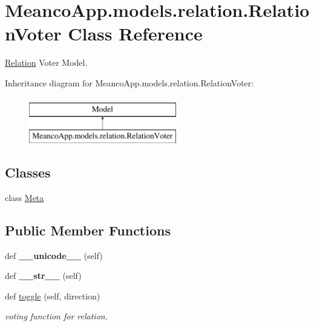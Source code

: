 \hypertarget{class_meanco_app_1_1models_1_1relation_1_1_relation_voter}{}\section{Meanco\+App.\+models.\+relation.\+Relation\+Voter Class Reference}
\label{class_meanco_app_1_1models_1_1relation_1_1_relation_voter}


\hyperlink{class_meanco_app_1_1models_1_1relation_1_1_relation}{Relation} Voter Model.  


Inheritance diagram for Meanco\+App.\+models.\+relation.\+Relation\+Voter\+:\begin{figure}[H]
\begin{center}
\leavevmode
\includegraphics[height=2.000000cm]{class_meanco_app_1_1models_1_1relation_1_1_relation_voter}
\end{center}
\end{figure}
\subsection*{Classes}
\begin{DoxyCompactItemize}
\item 
class \hyperlink{class_meanco_app_1_1models_1_1relation_1_1_relation_voter_1_1_meta}{Meta}
\end{DoxyCompactItemize}
\subsection*{Public Member Functions}
\begin{DoxyCompactItemize}
\item 
\hypertarget{class_meanco_app_1_1models_1_1relation_1_1_relation_voter_a1a8b33965930d1a907be5d90b3a89452}{}\label{class_meanco_app_1_1models_1_1relation_1_1_relation_voter_a1a8b33965930d1a907be5d90b3a89452} 
def {\bfseries \+\_\+\+\_\+unicode\+\_\+\+\_\+} (self)
\item 
\hypertarget{class_meanco_app_1_1models_1_1relation_1_1_relation_voter_aa3be70353e0112f544a56efa368702b3}{}\label{class_meanco_app_1_1models_1_1relation_1_1_relation_voter_aa3be70353e0112f544a56efa368702b3} 
def {\bfseries \+\_\+\+\_\+str\+\_\+\+\_\+} (self)
\item 
def \hyperlink{class_meanco_app_1_1models_1_1relation_1_1_relation_voter_a5ebede60af8df31bbc92c1fe8008ab1c}{toggle} (self, direction)
\begin{DoxyCompactList}\small\item\em voting function for relation. \end{DoxyCompactList}\end{DoxyCompactItemize}
